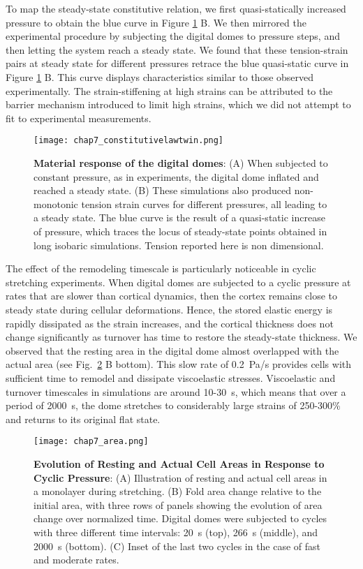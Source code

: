 To map the steady-state constitutive relation, we first quasi-statically increased pressure to obtain the blue curve in Figure \ref{fig_7_7} B. We then  mirrored the experimental procedure by subjecting the digital domes to pressure steps, and then letting the system reach a steady state. We found that these tension-strain pairs at steady state for different pressures retrace the blue quasi-static curve in Figure \ref{fig_7_7} B. This curve displays characteristics similar to those observed experimentally. The strain-stiffening at high strains can be attributed to the barrier mechanism introduced to limit high strains, which we did not attempt to fit to experimental measurements. 


\begin{figure}[]
	\centering
	\texttt{[image: chap7\_constitutivelawtwin.png]}
	\caption{\label{fig_7_7} \textbf{Material response of the digital domes}: (A) When subjected to constant pressure, as in experiments, the digital dome inflated and reached a steady state. (B) These simulations also produced non-monotonic tension strain curves for different pressures, all leading to a steady state. The blue curve is the result of a quasi-static increase of pressure, which traces the locus of steady-state points obtained in long isobaric simulations. Tension reported here is non dimensional.}
\end{figure}

The effect of the remodeling timescale is particularly noticeable in cyclic stretching experiments. When digital domes are subjected to a cyclic pressure at rates that are slower than cortical dynamics, then the cortex remains close to steady state during cellular deformations. Hence, the stored elastic energy is rapidly dissipated as the strain increases, and the cortical thickness does not change significantly as turnover has time to restore the steady-state thickness. We observed that the resting area in the digital dome almost overlapped with the actual area (see Fig.~\ref{fig_7_8} B bottom). This slow rate of 0.2~Pa/s provides cells with sufficient time to remodel and dissipate viscoelastic stresses. Viscoelastic and turnover timescales in simulations are around 10-30~s, which means that over a period of 2000~s, the dome stretches to considerably large strains of 250-300\% and returns to its original flat state.


\begin{figure}
	\centering
	\texttt{[image: chap7\_area.png]}
	\caption{\label{fig_7_8} \textbf{Evolution of Resting and Actual Cell Areas in Response to Cyclic Pressure}: (A) Illustration of resting and actual cell areas in a monolayer during stretching. (B) Fold area change relative to the initial area, with three rows of panels showing the evolution of area change over normalized time. Digital domes were subjected to cycles with three different time intervals: 20~s (top), 266~s (middle), and 2000~s (bottom). (C) Inset of the last two cycles in the case of fast and moderate rates.
	}
\end{figure}


